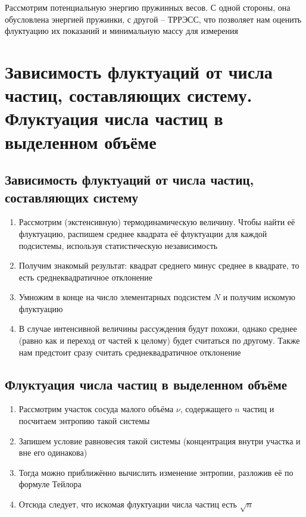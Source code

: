 \documentclass[a4paper, 14pt]{article}
\begin{document}
    Рассмотрим потенциальную энергию пружинных весов.
    С одной стороны, она обусловлена энергией пружинки, с другой -- ТРРЭСС, что позволяет нам оценить флуктуацию
    их показаний и минимальную массу для измерения
    
    \section{Зависимость флуктуаций от числа частиц, составляющих систему.
    Флуктуация числа частиц в выделенном объёме}
    
    \subsection{Зависимость флуктуаций от числа частиц, составляющих систему}
    
    \begin{enumerate}
        \item Рассмотрим (экстенсивную) термодинамическую величину.
        Чтобы найти её флуктуацию, распишем среднее квадрата её флуктуации для каждой подсистемы, используя
        статистическую независимость
        \item Получим знакомый результат: квадрат среднего минус среднее в квадрате, то есть среднеквадратичное
        отклонение
        \item Умножим в конце на число элементарных подсистем $N$ и получим искомую флуктуацию
        \item В случае интенсивной величины рассуждения будут похожи, однако среднее (равно как и переход от частей
        к целому) будет считаться по другому.
        Также нам предстоит сразу считать среднеквадратичное отклонение
    \end{enumerate}
    
    \subsection{Флуктуация числа частиц в выделенном объёме}
    
    \begin{enumerate}
        \item Рассмотрим участок сосуда малого объёма $\nu$, содержащего $n$ частиц и посчитаем энтропию такой системы
        \item Запишем условие равновесия такой системы (концентрация внутри участка и вне его одинакова)
        \item Тогда можно приближённо вычислить изменение энтропии, разложив её по формуле Тейлора
        \item Отсюда следует, что искомая флуктуации числа частиц есть $\sqrt{n}$
    \end{enumerate}
    
\end{document}

